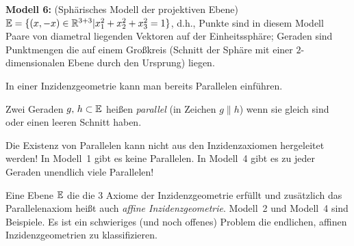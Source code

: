 {\bf Modell 6:} (\glqq Sphärisches Modell der projektiven Ebene\grqq )\\
$\mathbb E=\{ (x,-x)\in\mathbb R^{3+3} | x_1^2+  x_2^2 + x_3^2= 1 \}$, d.h.,
Punkte sind in diesem Modell Paare von diametral liegenden Vektoren auf der
Einheitssphäre;
Geraden sind Punktmengen die auf einem Großkreis (Schnitt der Sphäre
mit einer $2$-dimensionalen Ebene durch den Ursprung) liegen.






\bigskip


In einer Inzidenzgeometrie kann man bereits Parallelen einführen.

\begin{defi}[Parallelit\"{a}t]
Zwei Geraden $g,\,h \subset \mathbb E$ heißen {\em parallel} (in Zeichen $g\|h$)
wenn sie gleich sind oder einen leeren Schnitt haben.
\end{defi}

Die Existenz von Parallelen kann nicht aus den Inzidenzaxiomen
hergeleitet werden! In Modell~1 gibt es keine Parallelen. In Modell~4
gibt es zu jeder Geraden unendlich viele Parallelen!







Eine Ebene $\mathbb E$ die die 3 Axiome der Inzidenzgeometrie erfüllt und
zusätzlich das Parallelenaxiom heißt auch {\em affine Inzidenzgeometrie}.
Modell~2 und Modell~4 sind Beispiele. Es ist ein schwieriges (und
noch offenes) Problem die endlichen, affinen Inzidenzgeometrien zu
klassifizieren.

%








